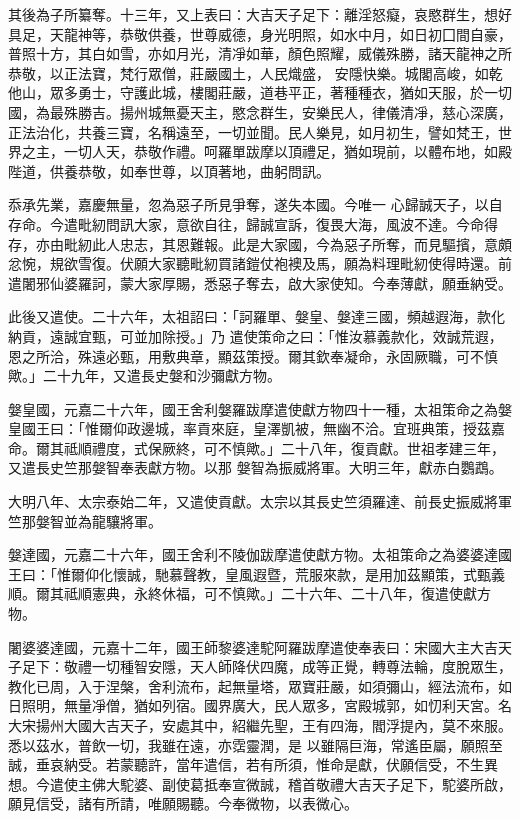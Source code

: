 \begin{pinyinscope}
 其後為子所纂奪。十三年，又上表曰：大吉天子足下：離淫怒癡，哀愍群生，想好具足，天龍神等，恭敬供養，世尊威德，身光明照，如水中月，如日初囗間自豪，普照十方，其白如雪，亦如月光，清凈如華，顏色照耀，威儀殊勝，諸天龍神之所恭敬，以正法寶，梵行眾僧，莊嚴國土，人民熾盛，
 安隱快樂。城閣高峻，如乾他山，眾多勇士，守護此城，樓閣莊嚴，道巷平正，著種種衣，猶如天服，於一切國，為最殊勝吉。揚州城無憂天主，愍念群生，安樂民人，律儀清凈，慈心深廣，正法治化，共養三寶，名稱遠至，一切並聞。民人樂見，如月初生，譬如梵王，世界之主，一切人天，恭敬作禮。呵羅單跋摩以頂禮足，猶如現前，以體布地，如殿陛道，供養恭敬，如奉世尊，以頂著地，曲躬問訊。



 忝承先業，嘉慶無量，忽為惡子所見爭奪，遂失本國。今唯一
 心歸誠天子，以自存命。今遣毗紉問訊大家，意欲自往，歸誠宣訴，復畏大海，風波不達。今命得存，亦由毗紉此人忠志，其恩難報。此是大家國，今為惡子所奪，而見驅擯，意頗忿惋，規欲雪復。伏願大家聽毗紉買諸鎧仗袍襖及馬，願為料理毗紉使得時還。前遣闍邪仙婆羅訶，蒙大家厚賜，悉惡子奪去，啟大家使知。今奉薄獻，願垂納受。



 此後又遣使。二十六年，太祖詔曰：「訶羅單、媻皇、媻達三國，頻越遐海，款化納貢，遠誠宜甄，可並加除授。」乃
 遣使策命之曰：「惟汝慕義款化，效誠荒遐，恩之所洽，殊遠必甄，用敷典章，顯茲策授。爾其欽奉凝命，永固厥職，可不慎歟。」二十九年，又遣長史媻和沙彌獻方物。



 媻皇國，元嘉二十六年，國王舍利媻羅跋摩遣使獻方物四十一種，太祖策命之為媻皇國王曰：「惟爾仰政邊城，率貢來庭，皇澤凱被，無幽不洽。宜班典策，授茲嘉命。爾其祗順禮度，式保厥終，可不慎歟。」二十八年，復貢獻。世祖孝建三年，又遣長史竺那媻智奉表獻方物。以那
 媻智為振威將軍。大明三年，獻赤白鸚鵡。



 大明八年、太宗泰始二年，又遣使貢獻。太宗以其長史竺須羅達、前長史振威將軍竺那媻智並為龍驤將軍。



 媻達國，元嘉二十六年，國王舍利不陵伽跋摩遣使獻方物。太祖策命之為婆婆達國王曰：「惟爾仰化懷誠，馳慕聲教，皇風遐暨，荒服來款，是用加茲顯策，式甄義順。爾其祗順憲典，永終休福，可不慎歟。」二十六年、二十八年，復遣使獻方物。



 闍婆婆達國，元嘉十二年，國王師黎婆達駝阿羅跋摩遣使奉表曰：宋國大主大吉天子足下：敬禮一切種智安隱，天人師降伏四魔，成等正覺，轉尊法輪，度脫眾生，教化已周，入于涅槃，舍利流布，起無量塔，眾寶莊嚴，如須彌山，經法流布，如日照明，無量凈僧，猶如列宿。國界廣大，民人眾多，宮殿城郭，如忉利天宮。名大宋揚州大國大吉天子，安處其中，紹繼先聖，王有四海，閻浮提內，莫不來服。悉以茲水，普飲一切，我雖在遠，亦霑靈潤，是
 以雖隔巨海，常遙臣屬，願照至誠，垂哀納受。若蒙聽許，當年遣信，若有所須，惟命是獻，伏願信受，不生異想。今遣使主佛大駝婆、副使葛抵奉宣微誠，稽首敬禮大吉天子足下，駝婆所啟，願見信受，諸有所請，唯願賜聽。今奉微物，以表微心。




\end{pinyinscope}
